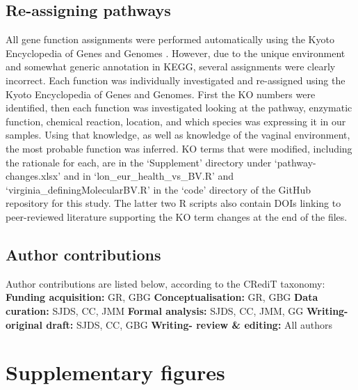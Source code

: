 \documentclass[sn-mathphys,Numbered]{sn-jnl}%
\begin{document}
\subsection{Re-assigning pathways}\label{subsec:subsecPathways}
All gene function assignments were performed automatically using the Kyoto Encyclopedia of Genes and Genomes \cite{Kanehisa:2010}. However, due to the unique environment and somewhat generic annotation in KEGG, several assignments were clearly incorrect. Each function was individually investigated and re-assigned using the Kyoto Encyclopedia of Genes and Genomes. First the KO numbers were identified, then each function was investigated looking at the pathway, enzymatic function, chemical reaction, location, and which species was expressing it in our samples. Using that knowledge, as well as knowledge of the vaginal environment, the most probable function was inferred. KO terms that were modified, including the rationale for each, are in the `Supplement' directory under `pathway-changes.xlsx' and in `lon\_eur\_health\_vs\_BV.R' and `virginia\_definingMolecularBV.R' in the `code' directory of the GitHub repository for this study. The latter two R scripts also contain DOIs linking to peer-reviewed literature supporting the KO term changes at the end of the files.

\subsection{Author contributions}\label{subsec:subsecContribs}
Author contributions are listed below, according to the CRediT taxonomy:
\\
\newline
\textbf{Funding acquisition:} GR, GBG\newline
\textbf{Conceptualisation:} GR, GBG\newline
\textbf{Data curation:} SJDS, CC, JMM\newline
\textbf{Formal analysis:} SJDS, CC, JMM, GG\newline
\textbf{Writing- original draft:} SJDS, CC, GBG\newline
\textbf{Writing- review \& editing:} All authors
\newpage

\section{Supplementary figures} \label{sec:secSupplFigs}
\end{document}
